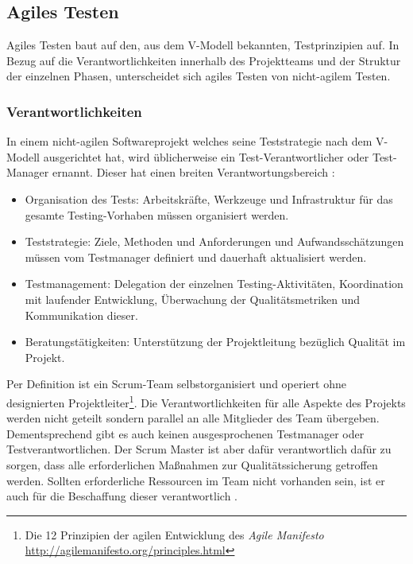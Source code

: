 \subsection{Agiles Testen}
Agiles Testen baut auf den, aus dem V-Modell bekannten, Testprinzipien auf. In Bezug auf die Verantwortlichkeiten innerhalb des Projektteams und der Struktur der einzelnen Phasen, unterscheidet sich agiles Testen von nicht-agilem Testen. 

\subsubsection{Verantwortlichkeiten}
In einem nicht-agilen Softwareprojekt welches seine Teststrategie nach dem V-Modell ausgerichtet hat, wird üblicherweise ein Test-Verantwortlicher oder Test-Manager ernannt. Dieser hat einen breiten Verantwortungsbereich \cite{linz_testing_2014}:

\begin{itemize}
\item Organisation des Tests: Arbeitskräfte, Werkzeuge und Infrastruktur für das gesamte Testing-Vorhaben müssen organisiert werden.
\item Teststrategie: Ziele, Methoden und Anforderungen und Aufwandsschätzungen müssen vom Testmanager definiert und dauerhaft aktualisiert werden.
\item Testmanagement: Delegation der einzelnen Testing-Aktivitäten, Koordination mit laufender Entwicklung, Überwachung der Qualitätsmetriken und Kommunikation dieser.
\item Beratungstätigkeiten: Unterstützung der Projektleitung bezüglich Qualität im Projekt.
\end{itemize}

Per Definition ist ein Scrum-Team selbstorganisiert und operiert ohne designierten Projektleiter\footnote{Die 12 Prinzipien der agilen Entwicklung des \textit{Agile Manifesto} \url{http://agilemanifesto.org/principles.html}}. Die Verantwortlichkeiten für alle Aspekte des Projekts werden nicht geteilt sondern parallel an alle Mitglieder des Team übergeben. Dementsprechend gibt es auch keinen ausgesprochenen Testmanager oder Testverantwortlichen. Der Scrum Master  ist aber dafür verantwortlich dafür zu sorgen, dass alle erforderlichen Maßnahmen zur Qualitätssicherung getroffen werden. Sollten erforderliche Ressourcen im Team nicht vorhanden sein, ist er auch für die Beschaffung dieser verantwortlich \cite{linz_testing_2014}.\\
